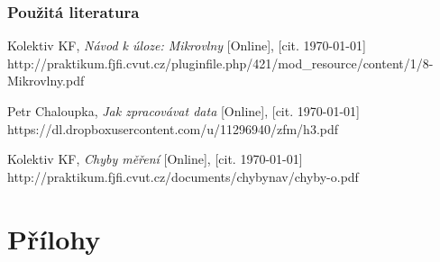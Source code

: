 \documentclass[english]{article}
\begin{document}
\section {Použitá literatura}
\begingroup
\renewcommand{\section}[2]{}

\begin{thebibliography}{9}
 Kolektiv KF, \emph{Návod k úloze: Mikrovlny} [Online], [cit. \today] \newline http://praktikum.fjfi.cvut.cz/pluginfile.php/421/mod\_resource/content/1/8-Mikrovlny.pdf

 Petr Chaloupka, \emph{Jak zpracovávat data} [Online], [cit. \today] \newline  https://dl.dropboxusercontent.com/u/11296940/zfm/h3.pdf


 Kolektiv KF, \emph{Chyby měření} [Online], [cit. \today] \newline http://praktikum.fjfi.cvut.cz/documents/chybynav/chyby-o.pdf




\end{thebibliography}
\endgroup
\setcounter{equation}{0}
\part{Přílohy}
\end{document}
